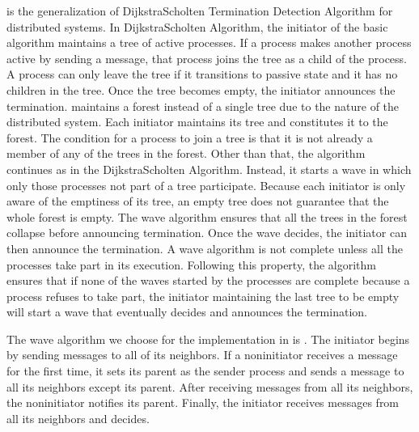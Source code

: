 \documentclass[letterpaper,10pt,english]{sphinxmanual}
\begin{document}
\sphinxAtStartPar
{\hyperref[\detokenize{docs/ShavitFrancez/algorithm:shavitfrancezterminationdetectionalgorithm}]{}}  is the generalization of Dijkstra\sphinxhyphen{}Scholten Termination Detection Algorithm  for distributed systems. In Dijkstra\sphinxhyphen{}Scholten Algorithm, the initiator of the basic algorithm maintains a tree of active processes. If a process makes another process active by sending a message, that process joins the tree as a child of the process. A process can only leave the tree if it transitions to passive state and it has no children in the tree. Once the tree becomes empty, the initiator announces the termination. {\hyperref[\detokenize{docs/ShavitFrancez/algorithm:shavitfrancezterminationdetectionalgorithm}]{}}  maintains a forest instead of a single tree due to the nature of the distributed system. Each initiator maintains its tree and constitutes it to the forest. The condition for a process to join a tree is that it is not already a member of any of the trees in the forest. Other than that, the algorithm continues as in the Dijkstra\sphinxhyphen{}Scholten Algorithm. Instead, it starts a wave in which only those processes not part of a tree participate. Because each initiator is only aware of the emptiness of its tree, an empty tree does not guarantee that the whole forest is empty. The wave algorithm ensures that all the trees in the forest collapse before announcing termination. Once the wave decides, the initiator can then announce the termination. A wave algorithm is not complete unless all the processes take part in its execution. Following this property, the algorithm ensures that if none of the waves started by the processes are complete because a process refuses to take part, the initiator maintaining the last tree to be empty will start a wave that eventually decides and announces the termination. 

\sphinxAtStartPar
The wave algorithm we choose for the implementation in {\hyperref[\detokenize{docs/ShavitFrancez/algorithm:shavitfrancezterminationdetectionalgorithm}]{}}  is {\hyperref[\detokenize{docs/ShavitFrancez/algorithm:echoalgorithm}]{}} . The {\hyperref[\detokenize{docs/ShavitFrancez/algorithm:echoalgorithm}]{}} initiator begins by sending messages to all of its neighbors. If a non\sphinxhyphen{}initiator receives a message for the first time, it sets its parent as the sender process and sends a message to all its neighbors except its parent. After receiving messages from all its neighbors, the non\sphinxhyphen{}initiator notifies its parent. Finally, the initiator receives messages from all its neighbors and decides.
\end{document}
